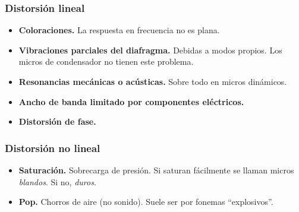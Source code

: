 \documentclass[a4paper, 8pt]{extarticle}
\begin{document}
\begin{multicols}{3}
  \subsubsection{Distorsión lineal}
  \begin{itemize}
    \item \textbf{Coloraciones.} La respuesta en frecuencia no es plana.
    \item \textbf{Vibraciones parciales del diafragma.} Debidas a modos propios. Los micros de condensador no tienen este problema.
    \item \textbf{Resonancias mecánicas o acústicas.} Sobre todo en micros dinámicos.
    \item \textbf{Ancho de banda limitado por componentes eléctricos.}
    \item \textbf{Distorsión de fase.}
  \end{itemize}
  \subsubsection{Distorsión no lineal}
  \begin{itemize}
    \item \textbf{Saturación.} Sobrecarga de presión. Si saturan fácilmente se llaman micros \textit{blandos}. Si no, \textit{duros}.
    \item \textbf{Pop.} Chorros de aire (no sonido). Suele ser por fonemas ``explosivos''.
  \end{itemize}
  \color{black}\xspace

\end{multicols}
\end{document}
